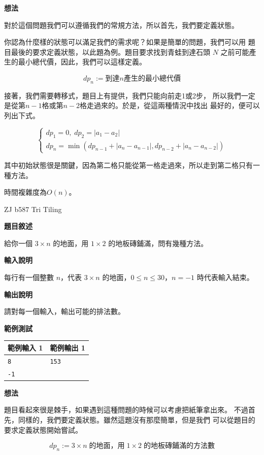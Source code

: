     \textbf{想法}

    對於這個問題我們可以遵循我們的常規方法，所以首先，我們要定義狀態。

    你認為什麼樣的狀態可以滿足我們的需求呢？如果是簡單的問題，我們可以用
    題目最後的要求定義狀態，以此題為例。題目要求找到青蛙到達石頭 $N$ 
    之前可能產生的最小總代價，因此，我們可以這樣定義。
    
    $$dp_n :=到達n產生的最小總代價$$

    接著，我們需要轉移式，題目上有提供，我們只能向前走1或2步，
    所以我們一定是從第$n-1$格或第$n-2$格走過來的。於是，從這兩種情況中找出
    最好的，便可以列出下式。

    $$
    \begin{cases}
        dp_1=0, \; dp_2=|a_1-a_2| \\
        dp_n=\min (dp_{n-1}+|a_n-a_{n-1}|,dp_{n-2}+|a_{n}-a_{n-2}|)
    \end{cases}
    $$

    其中初始狀態很是關鍵，因為第二格只能從第一格走過來，所以走到第二格只有一種方法。

    時間複雜度為$O(n)$。

    \example ZJ b587 Tri Tiling

    \textbf{題目敘述}

    給你一個 $3 \times n$ 的地面，用 $1 \times 2$ 的地板磚鋪滿，問有幾種方法。

    \textbf{輸入說明}

    每行有一個整數 $n$，代表 $3 \times n$ 的地面，$0 \leq n \leq 30$，$n=-1$ 時代表輸入結束。

    \textbf{輸出說明}

    請對每一個輸入，輸出可能的排法數。

    \textbf{範例測試}

    \begin{tabular}{|m{7cm}|m{7cm}|}
        \hline
        範例輸入 1 & 範例輸出 1 \\
        \hline
        \verb|8| & \verb|153| \\
        \verb|-1| & \\
        \hline
    \end{tabular}

    \textbf{想法}

    題目看起來很是棘手，如果遇到這種問題的時候可以考慮把紙筆拿出來。
    不過首先，同樣的，我們要定義狀態。雖然這題沒有那麼簡單，但是我們
    可以從題目的要求定義狀態開始嘗試。

    $$dp_n := 3 \times n \; 的地面，用 \; 1 \times 2 \; 的地板磚鋪滿的方法數$$

